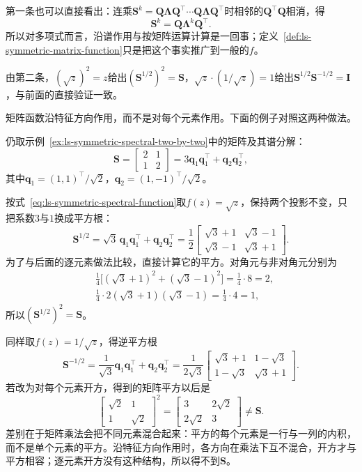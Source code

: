 第一条也可以直接看出：连乘$\bm S^k=\bm Q\bm\Lambda\bm Q^\top\cdots\bm Q\bm\Lambda\bm Q^\top$时相邻的$\bm Q^\top\bm Q$相消，得
\[
 \bm S^k=\bm Q\bm\Lambda^k\bm Q^\top .
\]
所以对多项式而言，沿谱作用与按矩阵运算计算是一回事；定义~\ref{def:ls-symmetric-matrix-function}只是把这个事实推广到一般的$f$。

由第二条，$(\sqrt z)^2=z$给出$(\bm S^{1/2})^2=\bm S$，$\sqrt z\cdot(1/\sqrt z)=1$给出$\bm S^{1/2}\bm S^{-1/2}=\bm I$，与前面的直接验证一致。

矩阵函数沿特征方向作用，而不是对每个元素作用。下面的例子对照这两种做法。

\begin{example}[矩阵平方根与逐元素开方]
\label{ex:ls-matrix-square-root-two-by-two}
仍取示例~\ref{ex:ls-symmetric-spectral-two-by-two}中的矩阵及其谱分解：
\[
 \bm S=\begin{bmatrix}2&1\\1&2\end{bmatrix}=3\bm q_1\bm q_1^\top+\bm q_2\bm q_2^\top ,
\]
其中$\bm q_1=(1,1)^\top/\sqrt2$，$\bm q_2=(1,-1)^\top/\sqrt2$。

按式~\eqref{eq:ls-symmetric-spectral-function}取$f(z)=\sqrt z$，保持两个投影不变，只把系数$3$与$1$换成平方根：
\[
 \bm S^{1/2}
 =\sqrt3\,\bm q_1\bm q_1^\top+\bm q_2\bm q_2^\top
 =\frac12\begin{bmatrix}\sqrt3+1&\sqrt3-1\\\sqrt3-1&\sqrt3+1\end{bmatrix}.
\]
为了与后面的逐元素做法比较，直接计算它的平方。对角元与非对角元分别为
\[
 \begin{aligned}
 &\tfrac14\bigl[(\sqrt3+1)^2+(\sqrt3-1)^2\bigr]=\tfrac14\cdot8=2,\\
 &\tfrac14\cdot2(\sqrt3+1)(\sqrt3-1)=\tfrac14\cdot4=1,
 \end{aligned}
\]
所以$(\bm S^{1/2})^2=\bm S$。

同样取$f(z)=1/\sqrt z$，得逆平方根
\[
 \bm S^{-1/2}
 =\frac1{\sqrt3}\bm q_1\bm q_1^\top+\bm q_2\bm q_2^\top
 =\frac1{2\sqrt3}\begin{bmatrix}\sqrt3+1&1-\sqrt3\\1-\sqrt3&\sqrt3+1\end{bmatrix}.
\]
若改为对每个元素开方，得到的矩阵平方以后是
\[
 \begin{bmatrix}\sqrt2&1\\1&\sqrt2\end{bmatrix}^2
 =\begin{bmatrix}3&2\sqrt2\\2\sqrt2&3\end{bmatrix}\neq\bm S .
\]
差别在于矩阵乘法会把不同元素混合起来：平方的每个元素是一行与一列的内积，而不是单个元素的平方。沿特征方向作用时，各方向在乘法下互不混合，开方才与平方相容；逐元素开方没有这种结构，所以得不到$\bm S$。
\end{example}

